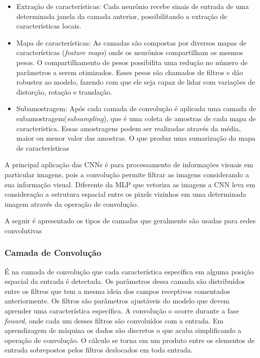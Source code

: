 \begin{itemize}
	\item Extração de características: Cada neurônio recebe sinais de entrada de uma determinada janela da camada anterior, possibilitando a extração de características locais. 
	\item Mapa de características: As camadas são compostas por diversos mapas de características (\textit{feature maps}) onde os neurônios compartilham os mesmos pesos. O compartilhamento de pesos possibilita uma redução no número de parâmetros a serem otimizados. Esses pesos são chamados de filtros e dão robustez ao modelo, fazendo com que ele seja capaz de lidar com variações de distorção, rotação e translação.
	
	\item Subamostragem: Após cada camada de convolução é aplicada uma camada de subamostragem(\textit{subsampling}), que é uma coleta de amostras de cada mapa de característica. Essas amostragens podem ser realizadas através da média, maior ou menor valor das amostras. O que produz uma sumarização do mapa de características
\end{itemize}

A principal aplicação das CNNs é para processamento de informações visuais em particular imagens, pois a convolução permite filtrar as imagens considerando a sua informação visual. Diferente da MLP que vetoriza as imagens a CNN leva em consideração a estrutura espacial entre os pixels vizinhos em uma determinada imagem através da operação de convolução.

A seguir é apresentado os tipos de camadas que geralmente são usadas para redes convolutivas

\subsubsection{Camada de Convolução}
É na camada de convolução que cada característica específica em alguma posição espacial da entrada é detectada. Os parâmetros dessa camada são distribuídos entre os filtros que tem a mesma ideia dos campos receptivos comentados anteriormente. Os filtros são parâmetros ajustáveis do modelo que devem aprender uma característica específica.  A convolução o ocorre durante a fase \textit{foward}, onde cada um desses filtros são convoluídos com a entrada. Em aprendizagem de máquina os dados são discretos o que acaba simplificando a operação de convolução. O cálculo se torna em um produto entre os elementos de entrada sobrepostos pelos filtros deslocados em toda entrada. 

